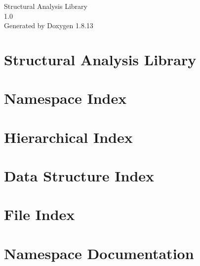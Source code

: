 \documentclass[twoside]{book}
\newcommand{\+}{\discretionary{\mbox{\scriptsize$\hookleftarrow$}}{}{}}
\newcommand{\clearemptydoublepage}{%
  \newpage{\pagestyle{empty}\cleardoublepage}%
}
\begin{document}
\hypersetup{pageanchor=false,
             bookmarksnumbered=true,
             pdfencoding=unicode
            }
\begin{titlepage}
\vspace*{7cm}
\begin{center}%
{\Large Structural Analysis Library \\[1ex]\large 1.\+0 }\\
\vspace*{1cm}
{\large Generated by Doxygen 1.8.13}\\
\end{center}
\end{titlepage}
\clearemptydoublepage
{}
\tableofcontents
\clearemptydoublepage
{}
\hypersetup{pageanchor=true}

\chapter{Structural Analysis Library}
\label{index}\hypertarget{index}{}
\chapter{Namespace Index}

\chapter{Hierarchical Index}

\chapter{Data Structure Index}

\chapter{File Index}

\chapter{Namespace Documentation}






\end{document}
